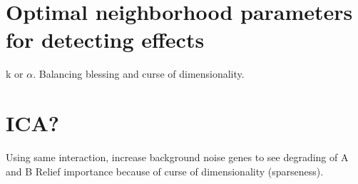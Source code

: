 \documentclass[10pt,letterpaper]{article}\usepackage[]{graphicx}\usepackage[]{color}
\begin{document}
\section{Optimal neighborhood parameters for detecting effects}
k or $\alpha$. 
Balancing blessing and curse of dimensionality.


\section{ICA?}

Using same interaction, increase background noise genes to see degrading of A and B Relief importance because of curse of dimensionality (sparseness).  


\end{document}
